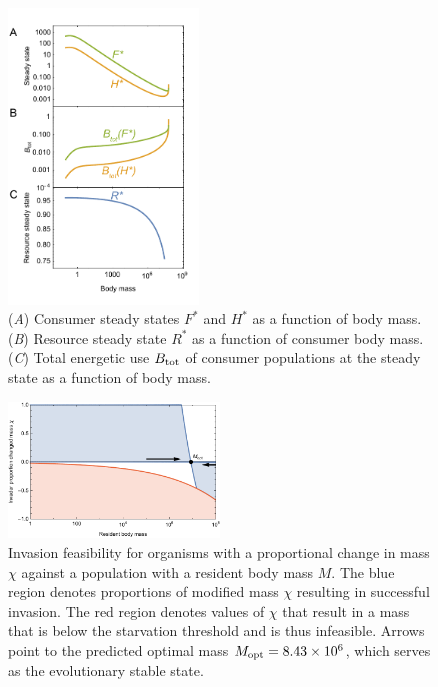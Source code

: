 \documentclass{pnastwo}
\begin{document}
\begin{figure}
\centering
\includegraphics[width=0.45\textwidth]{fig_FPAllometric.pdf}
\caption{ (\emph{A}) Consumer steady states $F^*$ and $H^*$ as a function of
  body mass. 
  (\emph{B}) Resource steady state $R^*$ as a function of consumer body mass.
  (\emph{C}) Total energetic use $B_{\rm tot}$ of consumer populations at the steady state as a function of body mass.}
\label{fig:mass}
\end{figure}  
 
\begin{figure}
\centering
\includegraphics[width=0.5\textwidth]{fig_Invasion.pdf}
\caption{ Invasion feasibility for organisms with a proportional change in
  mass $\chi$ against a population with a resident body mass $M$.  The blue
  region denotes proportions of modified mass $\chi$ resulting in successful invasion.  The
  red region denotes values of $\chi$ that result in a mass that is below the
  starvation threshold and is thus infeasible.
  Arrows point to the predicted optimal mass $M_{\rm opt}=8.43\times 10^6$, which serves as the evolutionary stable state.}
\label{fig:invasion}
\end{figure}  
 
\end{document}
